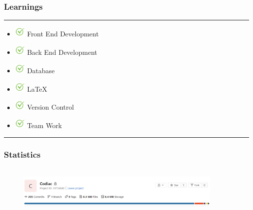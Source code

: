 \documentclass[14pt]{beamer}
\begin{document}
\begin{frame}
    \frametitle{Learnings}
    \noindent
    {\color{pink} \rule{\linewidth}{0.7mm} }
    \begin{itemize}
    \item [] \includegraphics[width=0.2in, height=0.2in]{./Codiac/logos/check.png} Front End Development \\
        \pause
    \item [] \includegraphics[width=0.2in, height=0.2in]{./Codiac/logos/check.png} Back End Development \\
        \pause
    \item [] \includegraphics[width=0.2in, height=0.2in]{./Codiac/logos/check.png} Database\\
        \pause
   \item [] \includegraphics[width=0.2in, height=0.2in]{./Codiac/logos/check.png} LaTeX \\
       \pause
   \item [] \includegraphics[width=0.2in, height=0.2in]{./Codiac/logos/check.png} Version Control \\
       \pause
   \item [] \includegraphics[width=0.2in, height=0.2in]{./Codiac/logos/check.png} Team Work\\
\end{itemize}
\noindent
    {\color{pink} \rule{\linewidth}{0.7mm} }
\end{frame}


\begin{frame}
      \frametitle{Statistics}
        \begin{figure}[htbp]
        \centerline{\includegraphics[width=4in, height=1in]{./Codiac/logos/commits.png}}
  \end{figure}
\end{frame}
\end{document}
